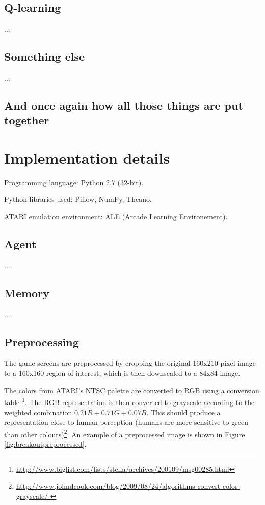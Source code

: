 \documentclass[a4paper,12pt]{article}
\begin{document}
\subsection{Q-learning}
...

\subsection{Something else}
...


\subsection{And once again how all those things are put together}



%
%
\pagebreak
\section{Implementation details}
Programming language: Python 2.7 (32-bit).

Python libraries used: Pillow, NumPy, Theano.

ATARI emulation environment: ALE (Arcade Learning Environement).

\subsection{Agent}
...

\subsection{Memory}
...

\subsection{Preprocessing}
\label{subsection_preproc}
The game screens are preprocessed by cropping the original 160x210-pixel image to a 160x160 region of interest, which is then downscaled to a 84x84 image.

The colors from ATARI's NTSC palette are converted to RGB using a conversion table
\footnote{\url{http://www.biglist.com/lists/stella/archives/200109/msg00285.html}}. The RGB representation is then converted to grayscale according to the weighted combination $0.21R + 0.71G + 0.07B$. This should produce a representation close to human perception (humans are more sensitive to green than other colours)\footnote{\url{http://www.johndcook.com/blog/2009/08/24/algorithms-convert-color-grayscale/
}}. An example of a preprocessed image is shown in Figure \ref{fig:breakoutpreprocessed}.
\end{document}
